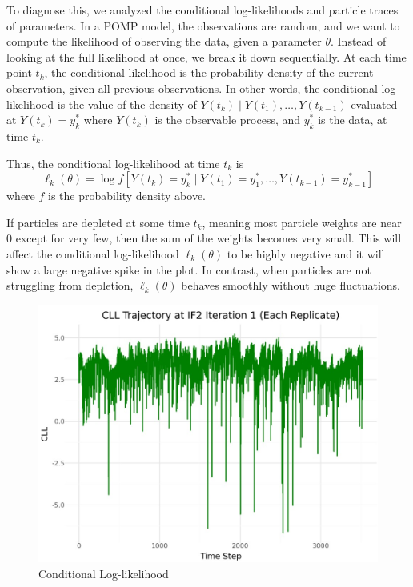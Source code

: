 \documentclass[11pt]{report}
\begin{document}
To diagnose this, we analyzed the conditional log-likelihoods and particle traces of parameters. In a POMP model, the observations are random, and we want to compute the likelihood of observing the data, given a parameter $\theta$. Instead of looking at the full likelihood at once, we break it down sequentially. At each time point $t_k$, the conditional likelihood is the probability density of the current observation, given all previous observations. In other words, the conditional log-likelihood is the value of the density of $Y(t_k) \mid Y(t_1), \dots, Y(t_{k-1})$ evaluated at $Y(t_k) = y_k^*$ where $ Y(t_k)$ is the observable process, and $y_k^*$ is the data, at time $t_k$.

Thus, the conditional log-likelihood at time $t_k$ is
\[
\ell_k(\theta) = \log f\left[Y(t_k) = y_k^* \mid Y(t_1) = y_1^*, \dots, Y(t_{k-1}) = y_{k-1}^*\right]
\]
where $f$ is the probability density above.

If particles are depleted at some time $t_k$, meaning most particle weights are near $0$ except for very few, then the sum of the weights becomes very small. This will affect the conditional log-likelihood $\ell_k(\theta)$ to be highly negative and it will show a large negative spike in the plot. In contrast, when particles are not struggling from depletion, $\ell_k(\theta)$ behaves smoothly without huge fluctuations.
\begin{figure}[ht] 
\begin{center}
\includegraphics[width=\textwidth]{rep1.jpg}
\end{center}
\caption{Conditional Log-likelihood}
\label{fig:cllplot}
\end{figure}
\end{document}
